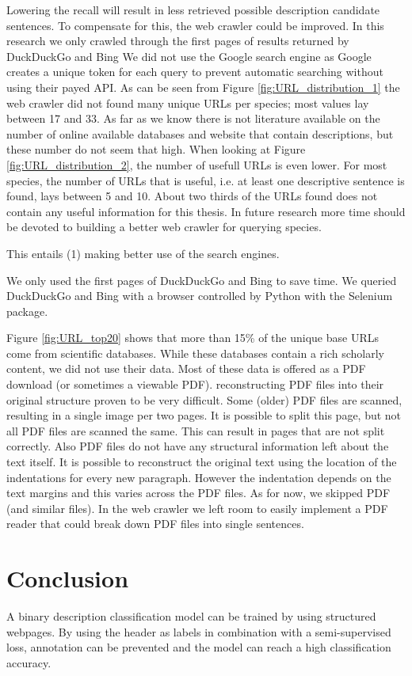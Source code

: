 \documentclass[a4paper, 12pt, oneside]{book} %
\begin{document}
Lowering the recall will result in less retrieved possible description candidate sentences.
To compensate for this, the web crawler could be improved.
In this research we only crawled through the first pages of results returned by DuckDuckGo and Bing
We did not use the Google search engine as Google creates a unique token for each query to prevent automatic searching without using their payed API.
As can be seen from Figure \ref{fig:URL_distribution_1} the web crawler did not found many unique URLs per species; most values lay between 17 and 33.
As far as we know there is not literature available on the number of online available databases and website that contain descriptions, but these number do not seem that high.
When looking at Figure \ref{fig:URL_distribution_2}, the number of usefull URLs is even lower.
For most species, the number of URLs that is useful, i.e. at least one descriptive sentence is found, lays between 5 and 10.
About two thirds of the URLs found does not contain any useful information for this thesis.
In future research more time should be devoted to building a better web crawler for querying species.

This entails (1) making better use of the search engines.


We only used the first pages of DuckDuckGo and Bing to save time.
We queried DuckDuckGo and Bing with a browser controlled by Python with the Selenium package.

Figure \ref{fig:URL_top20} shows that more than 15\% of the unique base URLs come from scientific databases.
While these databases contain a rich scholarly content, we did not use their data.
Most of these data is offered as a PDF download (or sometimes a viewable PDF).
reconstructing PDF files into their original structure proven to be very difficult.
Some (older) PDF files are scanned, resulting in a single image per two pages. 
It is possible to split this page, but not all PDF files are scanned the same. 
This can result in pages that are not split correctly.
Also PDF files do not have any structural information left about the text itself. 
It is possible to reconstruct the original text using the location of the indentations for every new paragraph.
However the indentation depends on the text margins and this varies across the PDF files.
As for now, we skipped PDF (and similar files). 
In the web crawler we left room to easily implement a PDF reader that could break down PDF files into single sentences.



\newpage
\section{Conclusion} \label{par:conclusion}
A binary description classification model can be trained by using structured webpages. 
By using the header as labels in combination with a semi-supervised loss, annotation can be prevented and the model can reach a high classification accuracy.
\end{document}
